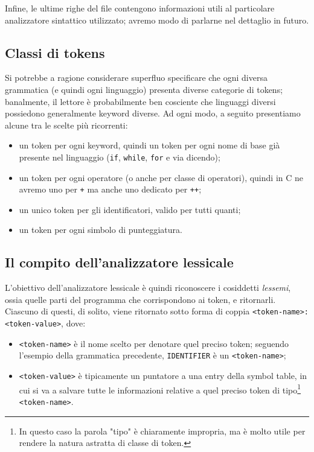 \documentclass[class=book, crop=false, oneside, 12pt]{standalone}
\begin{document}
Infine, le ultime righe del file contengono informazioni utili al particolare analizzatore sintattico utilizzato; avremo modo di parlarne nel dettaglio in futuro.

\subsection{Classi di tokens}
Si potrebbe a ragione considerare superfluo specificare che ogni diversa grammatica (e quindi ogni linguaggio) presenta diverse categorie di tokens; banalmente, il lettore è probabilmente ben cosciente che linguaggi diversi possiedono generalmente keyword diverse. Ad ogni modo, a seguito presentiamo alcune tra le scelte più ricorrenti:
\begin{itemize}
    \item un token per ogni keyword, quindi un token per ogni nome di base già presente nel linguaggio (\texttt{if}, \texttt{while}, \texttt{for} e via dicendo);
    \item un token per ogni operatore (o anche per classe di operatori), quindi in C ne avremo uno per \texttt{+} ma anche uno dedicato per \texttt{++}; 
    \item un unico token per gli identificatori, valido per tutti quanti;
    \item un token per ogni simbolo di punteggiatura. 
\end{itemize}

\subsection{Il compito dell'analizzatore lessicale}
L'obiettivo dell'analizzatore lessicale è quindi riconoscere i cosiddetti \emph{lessemi}, ossia quelle parti del programma che corrispondono ai token, e ritornarli. Ciascuno di questi, di solito, viene ritornato sotto forma di coppia \texttt{<token-name>: <token-value>}, dove:
\begin{itemize}
    \item \texttt{<token-name>} è il nome scelto per denotare quel preciso token; seguendo l'esempio della grammatica precedente, \texttt{IDENTIFIER} è un \texttt{<token-name>};
    \item \texttt{<token-value>} è tipicamente un puntatore a una entry della symbol table, in cui si va a salvare tutte le informazioni relative a quel preciso token di tipo\footnote{In questo caso la parola "tipo" è chiaramente impropria, ma è molto utile per rendere la natura astratta di classe di token.} \texttt{<token-name>}.
\end{itemize}
\end{document}
